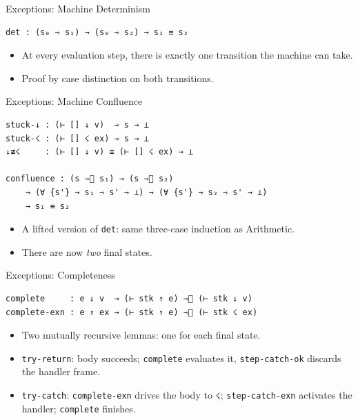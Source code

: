 \documentclass[10pt,compress,aspectratio=169]{beamer}
\begin{document}
\begin{frame}[fragile]{Exceptions: Machine Determinism}
\begin{verbatim}
det : (s₀ ⇾ s₁) → (s₀ ⇾ s₂) → s₁ ≡ s₂
\end{verbatim}
\begin{itemize}
    \item At every evaluation step, there is exactly one transition the machine can take.
    \item Proof by case distinction on both transitions.
\end{itemize}
\end{frame}

\begin{frame}[fragile]{Exceptions: Machine Confluence}
\begin{verbatim}
stuck-↓ : (⊢ [] ↓ v)  ⇾ s → ⊥
stuck-☇ : (⊢ [] ☇ ex) ⇾ s → ⊥
↓≢☇     : (⊢ [] ↓ v) ≡ (⊢ [] ☇ ex) → ⊥

confluence : (s ⇾⃰ s₁) → (s ⇾⃰ s₂)
    → (∀ {s'} → s₁ ⇾ s' → ⊥) → (∀ {s'} → s₂ ⇾ s' → ⊥)
    → s₁ ≡ s₂
\end{verbatim}
\begin{itemize}
    \item A lifted version of \texttt{det}: same three-case induction as Arithmetic.
    \item There are now \emph{two} final states.
\end{itemize}
\end{frame}

\begin{frame}[fragile]{Exceptions: Completeness}
\begin{verbatim}
complete     : e ⇓ v  → (⊢ stk ↑ e) ⇾⃰ (⊢ stk ↓ v)
complete-exn : e ⇑ ex → (⊢ stk ↑ e) ⇾⃰ (⊢ stk ☇ ex)
\end{verbatim}
\begin{itemize}
    \item Two mutually recursive lemmas: one for each final state.
    \item \texttt{try-return}: body succeeds; \texttt{complete} evaluates it, \texttt{step-catch-ok} discards the handler frame.
    \item \texttt{try-catch}: \texttt{complete-exn} drives the body to \verb|☇|; \texttt{step-catch-exn} activates the handler; \texttt{complete} finishes.
\end{itemize}
\end{frame}
\end{document}
